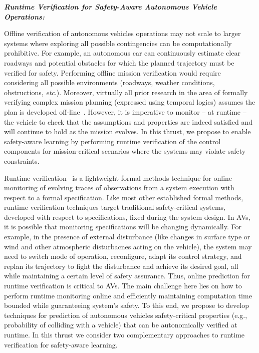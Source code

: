 \noindent\textbf{\em Runtime Verification for Safety-Aware Autonomous Vehicle Operations:} 

Offline verification of autonomous vehicles operations may not scale to larger systems where exploring all possible contingencies can be computationally prohibitive. 
For example, an autonomous car can continuously estimate clear roadways and potential obstacles for which the planned trajectory must be verified for safety. Performing offline mission verification would require considering all possible environments (roadways, weather conditions, obstructions, \emph{etc}.).  Moreover, virtually all prior research in the area of formally verifying complex mission planning (expressed using temporal logics) assumes the plan is developed off-line~\cite{saha2014automated,fainekos2005temporal,kress2009temporal}.  However, it is imperative to monitor -- at runtime -- the vehicle to check that the assumptions and properties are indeed satisfied and will continue to hold as the mission evolves. In this thrust, we propose to enable safety-aware learning by performing runtime verification of the control components for mission-critical scenarios where the systems may violate safety constraints.


 Runtime verification~\cite{SHL12} is a lightweight formal methods technique for online monitoring of evolving traces of observations from a system execution with respect to a formal specification.  Like most other established formal methods, runtime verification techniques target traditional safety-critical systems, developed with respect to specifications, fixed during the system design.  In AVs, it is possible that monitoring specifications will be changing dynamically.  For example, in the presence of external disturbance (like changes in surface type or wind and other atmospheric disturbacnes acting on the vehicle), the system may need to switch mode of operation, reconfigure, adapt its control strategy, and replan its trajectory to fight the disturbance and achieve its desired goal, all while maintaining a certain level of safety assurance. Thus, online prediction for runtime verification is critical to AVs. The main challenge here lies on how to perform runtime monitoring online and efficiently maintaining computation time bounded while guaranteeing system's safety.   To this end, we propose to develop techniques for prediction of autonomous vehicles safety-critical properties (e.g., probability of colliding with a vehicle) that can be autonomically verified at runtime.  In this thrust we consider two complementary approaches to runtime verification for safety-aware learning.


